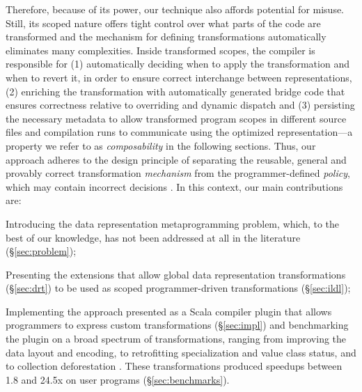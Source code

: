 Therefore, because of its power, our technique also affords potential
for misuse.  Still, its scoped nature offers tight control over what
parts of the code are transformed and the mechanism for defining
transformations automatically eliminates many complexities.  Inside
transformed scopes, the compiler is responsible for (1) automatically
deciding when to apply the transformation and when to revert it, in
order to ensure correct interchange between representations, (2)
enriching the transformation with automatically generated bridge code
that ensures correctness relative to overriding and dynamic dispatch
and (3) persisting the necessary metadata to allow transformed program
scopes in different source files and compilation runs to communicate
using the optimized representation---a property we refer to as
\emph{composability} in the following sections. Thus, our approach
adheres to the design principle of separating the reusable, general
and provably correct transformation \emph{mechanism} from the programmer-defined
\emph{policy}, which may contain incorrect decisions
\cite{lampson-mechanism-policy}. In this context, our main contributions are:
\begin{compactitem}
  \item Introducing the data representation metaprogramming problem, which, to the best of our knowledge, has not been addressed at all in the literature (\S\ref{sec:problem});
  \item Presenting the extensions that allow global data representation transformations (\S\ref{sec:drt}) to be used as scoped programmer-driven transformations (\S\ref{sec:ildl});
  \item Implementing the approach presented as a Scala compiler plugin \cite{ildl-plugin} that allows programmers to express custom transformations (\S\ref{sec:impl}) and benchmarking the plugin on a broad spectrum of transformations, ranging from improving the data layout and encoding, to retrofitting specialization and value class status, and to collection deforestation \cite{wadler-deforestation}. These transformations produced  speedups between 1.8 and 24.5x on user programs (\S\ref{sec:benchmarks}).
\end{compactitem}

